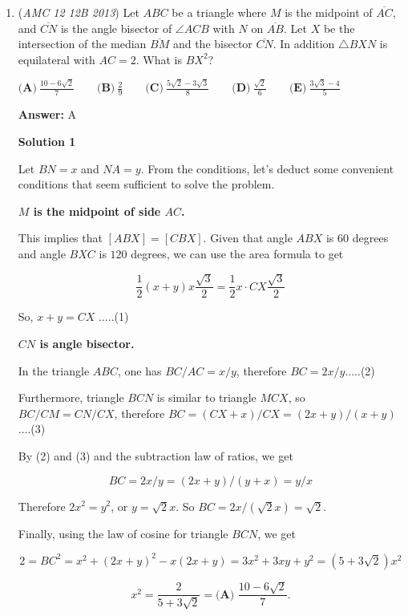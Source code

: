 \begin{enumerate}
 


	\item (\textit{AMC 12 12B 2013}) Let $ABC$ be a triangle where $M$ is the midpoint of $\overline{AC}$, and $\overline{CN}$ is the angle bisector of $\angle{ACB}$ with $N$ on $\overline{AB}$. Let $X$ be the intersection of the median $\overline{BM}$ and the bisector $\overline{CN}$. In addition $\triangle BXN$ is equilateral with $AC=2$. What is $BX^2$?


 $\textbf{(A)}\  \frac{10-6\sqrt{2}}{7} \qquad \textbf{(B)}\ \frac{2}{9} \qquad \textbf{(C)}\ \frac{5\sqrt{2}-3\sqrt{3}}{8} \qquad \textbf{(D)}\ \frac{\sqrt{2}}{6} \qquad \textbf{(E)}\ \frac{3\sqrt{3}-4}{5}$

 \textbf{Answer: }A



\textbf{Solution 1}

Let $BN=x$ and $NA=y$. From the conditions, let's deduct some convenient conditions that seem sufficient to solve the problem.

 


 \textbf{$M$ is the midpoint of side $AC$.}

 This implies that $[ABX]=[CBX]$. Given that angle $ABX$ is $60$ degrees and angle $BXC$ is $120$ degrees, we can use the area formula to get

 
 \[\frac{1}{2}(x+y)x \frac{\sqrt{3}}{2} = \frac{1}{2} x \cdot CX \frac{\sqrt{3}}{2}\]

 So, $x+y=CX$ .....(1)

 


 \textbf{$CN$ is angle bisector.}

 In the triangle $ABC$, one has $BC/AC=x/y$, therefore $BC=2x/y$.....(2)

 Furthermore, triangle $BCN$ is similar to triangle $MCX$, so $BC/CM=CN/CX$, therefore $BC = (CX+x)/CX = (2x+y)/(x+y)$....(3)

 By (2) and (3) and the subtraction law of ratios, we get 

 
 \[BC=2x/y = (2x+y)/(y+x) = y/x\]

 Therefore $2x^2=y^2$, or $y=\sqrt{2}x$. So $BC = 2x/(\sqrt{2}x) = \sqrt{2}$.

 Finally, using the law of cosine for triangle $BCN$, we get

 
 \[2 = BC^2 = x^2 + (2x+y)^2 - x(2x+y) = 3x^2 + 3xy + y^2 = \left(5+3\sqrt{2}\right)x^2\]

 \[x^2 = \frac{2}{5+3\sqrt{2}} = \boxed{\textbf{(A) }\frac{10-6\sqrt{2}}{7}}.\]





\end{enumerate}
